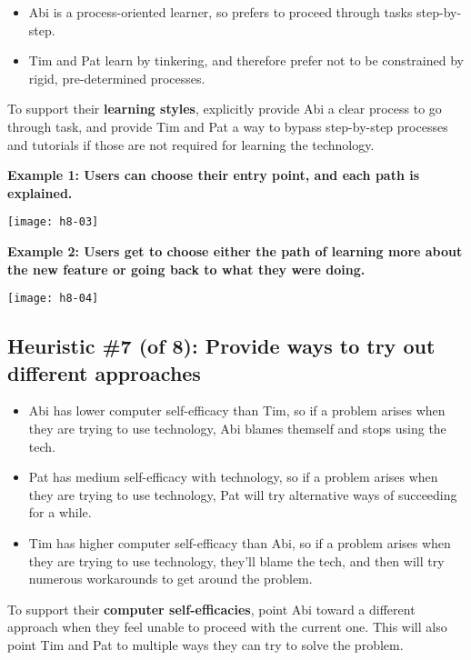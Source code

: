 \begin{itemize}
\item Abi is a process-oriented learner, so prefers to proceed through tasks step-by-step.
\item Tim and Pat learn by tinkering, and therefore prefer not to be constrained by rigid, pre-determined processes.
\end{itemize}

\noindent To support their \textbf{learning styles}, explicitly provide Abi a clear process to go through task, and provide Tim and Pat a way to bypass step-by-step processes and tutorials if those are not required for learning the technology.

\spacer
\noindent\textbf{Example 1: Users can choose their entry point, and each path is explained.}\\
\begin{center}
\noindent\texttt{[image: h8-03]}
\end{center}

\noindent\textbf{Example 2: Users get to choose either the path of learning more about the new feature or going back to what they were doing.}\\
\begin{center}
\noindent\texttt{[image: h8-04]}
\end{center}

\subsection{Heuristic \#7 (of 8): Provide ways to try out different approaches}

\begin{itemize}
\item Abi has lower computer self-efficacy than Tim, so if a problem arises when they are trying to use technology, Abi blames themself and stops using the tech.
\item Pat has medium self-efficacy with technology, so if a problem arises when they are trying to use technology,  Pat will try alternative ways of succeeding for a while.
\item Tim has higher computer self-efficacy than Abi, so if a problem arises when they are trying to use technology, they’ll blame the tech, and then will try numerous workarounds to get around the problem.
\end{itemize}

\noindent To support their \textbf{computer self-efficacies}, point Abi toward a different approach when they feel unable to proceed with the current one. This will also point Tim and Pat to multiple ways they can try to solve the problem.

